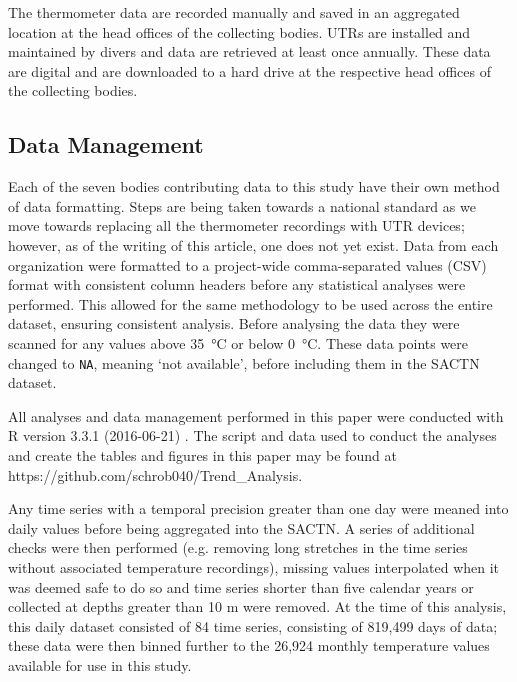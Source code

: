 \documentclass{ametsoc}
\begin{document}
The thermometer data are recorded manually and saved in an aggregated location at the head offices of the collecting bodies. UTRs are installed and maintained by divers and data are retrieved at least once annually. These data are digital and are downloaded to a hard drive at the respective head offices of the collecting bodies.

\subsection{Data Management}
Each of the seven bodies contributing data to this study have their own method of data formatting. Steps are being taken towards a national standard as we move towards replacing all the thermometer recordings with UTR devices; however, as of the writing of this article, one does not yet exist. Data from each organization were formatted to a project-wide comma-separated values (CSV) format with consistent column headers before any statistical analyses were performed. This allowed for the same methodology to be used across the entire dataset, ensuring consistent analysis. Before analysing the data they were scanned for any values above \SI{35}{\degreeCelsius} or below \SI{0}{\degreeCelsius}. These data points were changed to \texttt{NA}, meaning `not available', before including them in the SACTN dataset.

All analyses and data management performed in this paper were conducted with R version 3.3.1 (2016-06-21) \citep{R}. The script and data used to conduct the analyses and create the tables and figures in this paper may be found at https://github.com/schrob040/Trend_Analysis.

Any time series with a temporal precision greater than one day were meaned into daily values before being aggregated into the SACTN. A series of additional checks were then performed (e.g. removing long stretches in the time series without associated temperature recordings), missing values interpolated when it was deemed safe to do so and time series shorter than five calendar years or collected at depths greater than 10 m were removed. At the time of this analysis, this daily dataset consisted of 84 time series, consisting of 819,499 days of data; these data were then binned further to the 26,924 monthly temperature values available for use in this study.

\end{document}
